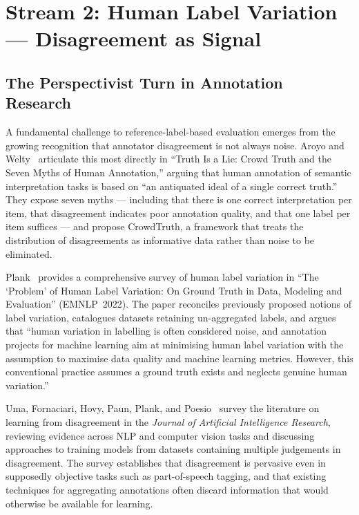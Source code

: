 \section{Stream 2: Human Label Variation --- Disagreement as Signal}

\subsection{The Perspectivist Turn in Annotation Research}

A fundamental challenge to reference-label-based evaluation emerges from the
growing recognition that annotator disagreement is not always noise.  Aroyo
and Welty~\cite{aroyo2015} articulate this most directly in ``Truth Is a Lie:
Crowd Truth and the Seven Myths of Human Annotation,'' arguing that human
annotation of semantic interpretation tasks is based on ``an antiquated ideal
of a single correct truth.''  They expose seven myths --- including that there
is one correct interpretation per item, that disagreement indicates poor
annotation quality, and that one label per item suffices --- and propose
CrowdTruth, a framework that treats the distribution of disagreements as
informative data rather than noise to be eliminated.

Plank~\cite{plank2022} provides a comprehensive survey of human label
variation in ``The `Problem' of Human Label Variation: On Ground Truth in
Data, Modeling and Evaluation'' (EMNLP~2022).  The paper reconciles
previously proposed notions of label variation, catalogues datasets retaining
un-aggregated labels, and argues that ``human variation in labelling is often
considered noise, and annotation projects for machine learning aim at
minimising human label variation with the assumption to maximise data quality
and machine learning metrics.  However, this conventional practice assumes a
ground truth exists and neglects genuine human variation.''

Uma, Fornaciari, Hovy, Paun, Plank, and Poesio~\cite{uma2021} survey the
literature on learning from disagreement in the \emph{Journal of Artificial
Intelligence Research}, reviewing evidence across NLP and computer vision tasks
and discussing approaches to training models from datasets containing multiple
judgements in disagreement.  The survey establishes that disagreement is
pervasive even in supposedly objective tasks such as part-of-speech tagging,
and that existing techniques for aggregating annotations often discard
information that would otherwise be available for learning.

